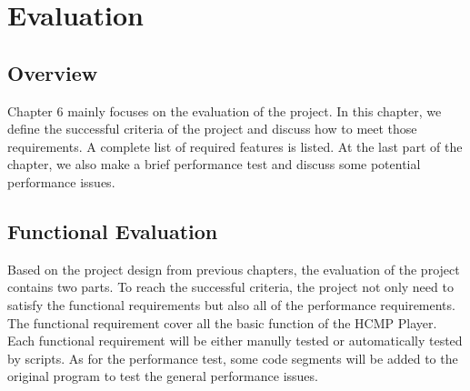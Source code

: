 
\chapter{Evaluation} %



\ifpdf
    \graphicspath{{X/figures/PNG/}{X/figures/PDF/}{X/figures/}}
\else
    \graphicspath{{X/figures/EPS/}{X/figures/}}
\fi


\section{Overview}
Chapter 6 mainly focuses on the evaluation of the project. In
this chapter, we define the successful criteria of the project and discuss
how to meet those requirements. A complete list of required features is
listed. At the last part of the chapter, we also make a brief performance test 
and discuss some potential performance issues.

\section{Functional Evaluation}
Based on the project design from previous chapters, the evaluation of the 
project contains two parts. To reach the successful criteria, the project not 
only need to satisfy the functional requirements but also all of the performance 
requirements. The 
functional requirement cover all the basic function of the HCMP Player.
Each functional requirement will be 
either manully tested or automatically tested by scripts. As for the
performance test, some code segments will be added to the original program to
test the general performance issues.

